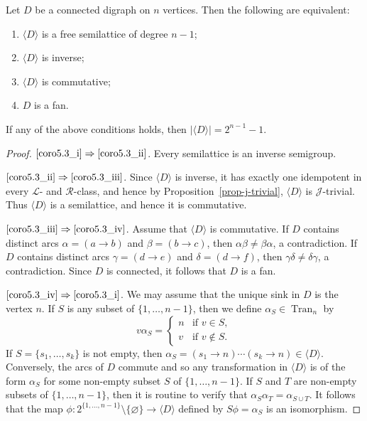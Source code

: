 \documentclass[ALCO,ThmDefs,Unicode,epreuves]{cedram}
\DeclareMathOperator{\Tran}{Tran}
\newcommand{\genset}[1]{\langle#1\rangle}
\newcommand{\LL}{\mathcal{L}}
\newcommand{\R}{\mathcal{R}}
\newcommand{\J}{\mathcal{J}}
\begin{document}
\goodbreak
\begin{proposition}\label{prop-inverse}
 Let $D$ be a connected digraph on $n$ vertices. Then the following are equivalent:
 \begin{enumerate}[(\roman*)]
 \item\label{coro5.3_i}
 $\genset{D}$ is a free semilattice of degree $n-1$;

 \item\label{coro5.3_ii}
 $\genset{D}$ is inverse;

 \item\label{coro5.3_iii}
 $\genset{D}$ is commutative;

 \item\label{coro5.3_iv}
 $D$ is a fan.
 \end{enumerate}
 If any of the above conditions holds, then $|\genset{D}| = 2 ^ {n
 - 1} - 1$.
\end{proposition}
\begin{proof}
 $\ref{coro5.3_i}\Rightarrow\ref{coro5.3_ii}$.
 Every semilattice is an inverse semigroup. 

 $\ref{coro5.3_ii}\Rightarrow\ref{coro5.3_iii}$. 
 Since $\genset{D}$ is inverse, it has exactly one idempotent in every $\LL$-
 and $\R$-class, and hence by Proposition~\ref{prop-j-trivial}, $\genset{D}$
 is $\J$-trivial. Thus $\genset{D}$ is a semilattice, and hence it is
 commutative.

$\ref{coro5.3_iii}\Rightarrow\ref{coro5.3_iv}$. 
 Assume that $\genset D$ is commutative. If $D$ contains distinct arcs $\alpha=(a \to b)$ and $\beta=(b\to c)$, then
 $\alpha\beta\not=\beta\alpha$, a contradiction. If $D$
 contains distinct arcs $\gamma=(d \to e)$ and $\delta=(d\to f)$, then
 $\gamma\delta\not=\delta\gamma$, a contradiction. Since $D$ is connected, it
 follows that $D$ is a fan.

 $\ref{coro5.3_iv}\Rightarrow\ref{coro5.3_i}$. 
 We may assume that the unique sink in $D$ is the vertex $n$. 
 If $S$ is any subset of $\{1, \ldots, n - 1\}$, then we define
 $\alpha_S\in\Tran_n$ by
 \begin{equation*}
 v \alpha_S = 
 \begin{cases}
 n & \text{if } v \in S,\\
 v & \text{if } v \not\in S.
 \end{cases}
 \end{equation*}
 If $S = \{s_1, \dots, s_k\}$ is not empty, then $\alpha_S = (s_1 \to n)
 \cdots
 (s_k \to n) \in \genset{D}$.
 Conversely, the arcs of $D$ commute and so any transformation in $\genset{D}$
 is of the form $\alpha_S$ for some non-empty subset $S$ of $\{1, \ldots, n -
 1\}$. If $S$ and $T$ are non-empty subsets of $\{1, \ldots, n - 1\}$, then 
 it is routine to verify that $\alpha_S \alpha_T = \alpha_{S \cup T}$. 
 It follows that the map $\phi: 2^{\{1, \ldots, n -
 1\}}\setminus\{\varnothing\}\to\genset{D}$ defined by $S\phi = \alpha_S$
 is an isomorphism.
\end{proof}
\end{document}
